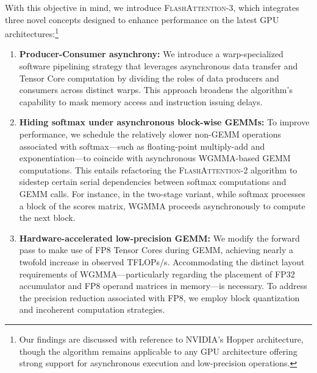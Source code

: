 With this objective in mind, we introduce \textsc{FlashAttention-3}, which integrates three novel concepts designed to enhance performance on the latest GPU architectures:\footnote{Our findings are discussed with reference to NVIDIA's Hopper architecture, though the algorithm remains applicable to any GPU architecture offering strong support for asynchronous execution and low-precision operations.}

\begin{enumerate}

\item \textbf{Producer-Consumer asynchrony:} We introduce a warp-specialized software pipelining strategy that leverages asynchronous data transfer and Tensor Core computation by dividing the roles of data producers and consumers across distinct warps. This approach broadens the algorithm’s capability to mask memory access and instruction issuing delays.

\item \textbf{Hiding softmax under asynchronous block-wise GEMMs:} To improve performance, we schedule the relatively slower non-GEMM operations associated with softmax—such as floating-point multiply-add and exponentiation—to coincide with asynchronous WGMMA-based GEMM computations. This entails refactoring the \textsc{FlashAttention-2} algorithm to sidestep certain serial dependencies between softmax computations and GEMM calls. For instance, in the two-stage variant, while softmax processes a block of the scores matrix, WGMMA proceeds asynchronously to compute the next block.

\item \textbf{Hardware-accelerated low-precision GEMM:} We modify the forward pass to make use of FP8 Tensor Cores during GEMM, achieving nearly a twofold increase in observed TFLOPs/s. Accommodating the distinct layout requirements of WGMMA—particularly regarding the placement of FP32 accumulator and FP8 operand matrices in memory—is necessary. To address the precision reduction associated with FP8, we employ block quantization and incoherent computation strategies.


\end{enumerate}
